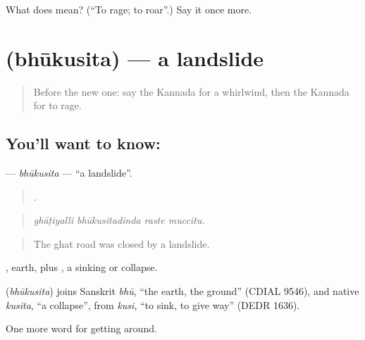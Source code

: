 \begin{tcolorbox}[breakable,colback=teal!4,colframe=teal!35!black,title={Before you move on}]
What does  mean? (\textquotedblleft{}To rage; to roar\textquotedblright{}.) Say it once more.
\end{tcolorbox}
\section[\texorpdfstring{\kn{ಭೂಕುಸಿತ} (bhūkusita)}{ಭೂಕುಸಿತ (bhūkusita)}]{ (bhūkusita) — a landslide}

\label{lesson:KA-C487-bhukusita}



\begin{quote}
Before the new one: say the Kannada for a whirlwind, then the Kannada for to rage.
\end{quote}

\subsection*{You'll want to know: }
\textbf{} — \emph{bhūkusita} — \textquotedblleft{}a landslide\textquotedblright{}.

\begin{quote}
   .
\end{quote}

\begin{quote}
\emph{ghāṭiyalli bhūkusitadinda raste muccitu.}
\end{quote}

\begin{quote}
The ghat road was closed by a landslide.
\end{quote}

, earth, plus , a sinking or collapse.

\begin{cousinweb}
\textbf{} (\emph{bhūkusita}) joins Sanskrit \emph{bhū}, \textquotedblleft{}the earth, the ground\textquotedblright{} (CDIAL 9546), and native \emph{kusita}, \textquotedblleft{}a collapse\textquotedblright{}, from \emph{kusi}, \textquotedblleft{}to sink, to give way\textquotedblright{} (DEDR 1636).
\end{cousinweb}

\begin{grammarlens}[title={What you've built}]
One more word for getting around.
\end{grammarlens}

